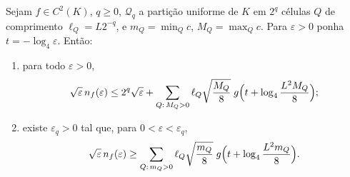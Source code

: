 \begin{lemma}\label{map:artigo_2:12.6}
\label{artigo_2:lem:phase-cell-counts}
Sejam $f\in C^2(K)$, $q\ge0$, $\mathcal Q_q$ a partição uniforme de $K$ em
$2^q$ células $Q$ de comprimento $\ell_Q=L2^{-q}$, e
$m_Q=\min_Qc$, $M_Q=\max_Qc$. Para $\varepsilon>0$ ponha $t=-\log_4\varepsilon$.
Então:
\begin{enumerate}[label=(\alph*)]
\item para todo $\varepsilon>0$,
 \[
  \sqrt\varepsilon\,n_f(\varepsilon)\le2^q\sqrt\varepsilon
  +\sum_{Q:\,M_Q>0}\ell_Q\sqrt{\frac{M_Q}{8}}\;g\Bigl(t+\log_4\frac{L^2M_Q}{8}\Bigr);
 \]
\item existe $\varepsilon_q>0$ tal que, para $0<\varepsilon<\varepsilon_q$,
 \[
  \sqrt\varepsilon\,n_f(\varepsilon)\ge
  \sum_{Q:\,m_Q>0}\ell_Q\sqrt{\frac{m_Q}{8}}\;g\Bigl(t+\log_4\frac{L^2m_Q}{8}\Bigr).
 \]
\end{enumerate}
\end{lemma}

